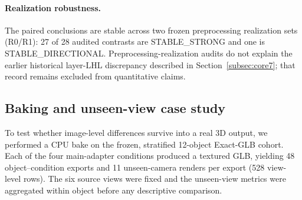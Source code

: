 \documentclass[times,twocolumn,final]{elsarticle}
\begin{document}
\paragraph{Realization robustness.}
The paired conclusions are stable across two frozen preprocessing
realization sets (R0/R1): 27 of 28 audited contrasts are STABLE\_STRONG and
one is STABLE\_DIRECTIONAL. Preprocessing-realization audits do not explain
the earlier historical layer-LHL discrepancy described in
Section~\ref{subsec:core7}; that record remains excluded from quantitative
claims.

\subsection{Baking and unseen-view case study}
\label{subsec:baking}

To test whether image-level differences survive into a real 3D output, we
performed a CPU bake on the frozen, stratified 12-object Exact-GLB cohort.
Each of the four main-adapter conditions produced a textured GLB, yielding 48
object--condition exports and 11 unseen-camera renders per export (528
view-level rows). The six source views were fixed and the unseen-view metrics
were aggregated within object before any descriptive comparison.

\begin{table}[t]
\centering
\caption{Descriptive unseen-view baking metrics for the 12-object stratified case study. These values are not a population estimate; DISTS was unavailable.}
\label{tab:bake12}
\small
{}
\end{table}
\end{document}
